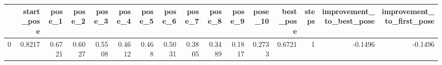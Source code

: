 \begin{tabular}{lrrrrrrrrrrrrrrr}
\toprule
{} &  start\_pose &  pose\_1 &  pose\_2 &  pose\_3 &  pose\_4 &  pose\_5 &  pose\_6 &  pose\_7 &  pose\_8 &  pose\_9 &  pose\_10 &  best\_pose &  steps &  improvement\_to\_best\_pose &  improvement\_to\_first\_pose \\
\midrule
0 &      0.8217 &  0.6721 &  0.6027 &  0.5508 &  0.4612 &   0.468 &  0.5031 &  0.3805 &  0.3489 &  0.1817 &   0.2733 &     0.6721 &      1 &                   -0.1496 &                    -0.1496 \\
\bottomrule
\end{tabular}
